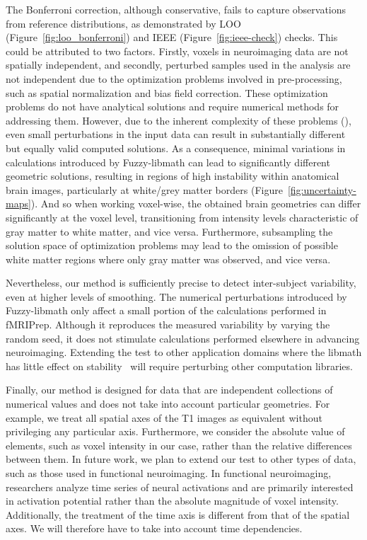 \documentclass[lettersize,journal]{IEEEtran}
\newcommand{\fmriprep}{fMRIPrep\xspace}
\begin{document}
The Bonferroni correction, although conservative, fails to capture observations from reference distributions, as demonstrated by LOO (Figure~\ref{fig:loo_bonferroni}) and IEEE (Figure~\ref{fig:ieee-check}) checks. This could be attributed to two factors. Firstly, voxels in neuroimaging data are not spatially independent, and secondly, perturbed samples used in the analysis are not independent due to the optimization problems involved in pre-processing, such as spatial normalization and bias field correction. These optimization problems do not have analytical solutions and require numerical methods for addressing them. However, due to the inherent complexity of these problems (\cite{clarenz2006computational}), even small perturbations in the input data can result in substantially different but equally valid computed solutions. As a consequence, minimal variations in calculations introduced by Fuzzy-libmath can lead to significantly different geometric solutions, resulting in regions of high instability within anatomical brain images, particularly at white/grey matter borders (Figure~\ref{fig:uncertainty-maps}). And so when working voxel-wise, the obtained brain geometries can differ significantly at the voxel level, transitioning from intensity levels characteristic of gray matter to white matter, and vice versa. Furthermore, subsampling the solution space of optimization problems may lead to the omission of possible white matter regions where only gray matter was observed, and vice versa.

Nevertheless, our method is sufficiently precise to detect inter-subject variability, even at higher levels of smoothing. The numerical perturbations introduced by Fuzzy-libmath only affect a small portion of the calculations performed in \fmriprep. Although it reproduces the measured variability by varying the random seed, it does not stimulate calculations performed elsewhere in advancing neuroimaging. Extending the test to other application domains where the libmath has little effect on stability~\cite{pepe2022numerical} will require perturbing other computation libraries.

Finally, our method is designed for data that are independent collections of numerical values and does not take into account particular geometries. For example, we treat all spatial axes of the T1 images as equivalent without privileging any particular axis. Furthermore, we consider the absolute value of elements, such as voxel intensity in our case, rather than the relative differences between them. In future work, we plan to extend our test to other types of data, such as those used in functional neuroimaging. In functional neuroimaging, researchers analyze time series of neural activations and are primarily interested in activation potential rather than the absolute magnitude of voxel intensity. Additionally, the treatment of the time axis is different from that of the spatial axes. We will therefore have to take into account time dependencies.
\end{document}
